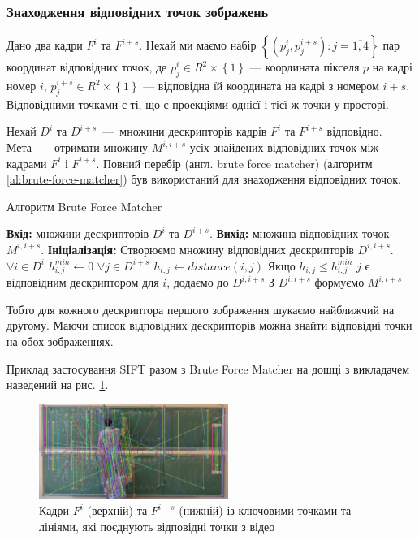 \subsubsection{Знаходження відповідних точок зображень}

Дано два кадри \(F^{i}\) та \(F^{i + s}\). Нехай ми маємо набір
\(\left\{ \left( p_{j}^{i},p_{j}^{i + s} \right):j = \overline{1,4} \right\}\)
пар координат відповідних точок, де
\(p_{j}^{i} \in R^{2} \times \left\{ 1 \right\}\) --- координата пікселя
\(p\) на кадрі номер \(i\),
\(p_{j}^{i + s} \in R^{2} \times \left\{ 1 \right\}\) --- відповідна їй
координата на кадрі з номером \(i + s\). Відповідними точками є ті, що є
проекціями однієї і тієї ж точки у просторі.

Нехай $D^i$ та $D^{i+s}$~---~множини дескрипторів кадрів \(F^{i}\) та \(F^{i + s}\)
відповідно. Мета~---~отримати множину \(M^{i,i+s}\) усіх знайдених відповідних точок  між кадрами
\(F^{i}\) і \(F^{i + s}\).
Повний перебір (англ. brute force matcher) (алгоритм \ref{al:brute-force-matcher})
був використаний для знаходження відповідних точок.

\begin{algorithm}[H]
    \caption{Алгоритм Brute Force Matcher}
    \label{al:brute-force-matcher}
    \begin{algorithmic}
        \State \textbf{Вхід:} множини дескрипторів $D^i$ та $D^{i+s}$.
        \State \textbf{Вихід:} множина відповідних точок \(M^{i,i+s}\).
        \State \textbf{Ініціалізація:} Створюємо множину відповідних дескрипторів $D^{i,i+s}$.
        \State $\forall i \in D^i$
        \State  \qquad $h^{min}_{i,j} \gets 0$
        \State  \qquad  $\forall j \in D^{i+s}$
        \State  \qquad \qquad  $h_{i,j} \gets distance(i,j)$
        \State  \qquad \qquad  Якщо {$h_{i,j} \leq h^{min}_{i,j}$}
        \State  \qquad \qquad  \qquad $j$ є відповідним  дескриптором для $i$, додаємо до  $D^{i,i+s}$
        \State З $D^{i,i+s}$ формуємо \(M^{i,i+s}\)
    \end{algorithmic}
\end{algorithm}

Тобто для кожного дескриптора першого зображення шукаємо найближчий на другому.
Маючи список відповідних дескрипторів можна знайти відповідні точки на обох зображеннях.

Приклад застосування SIFT разом з Brute Force Matcher на
дошці з викладачем наведений на рис. \ref{fig:matches_img}.

\begin{figure}[H]
    \centering
    \includegraphics[width=0.55\textwidth]{images/matches_img}
    \caption{Кадри $F^i$ (верхній) та $F^{i+s}$ (нижній) із ключовими точками та лініями,
        які поєднують відповідні точки з відео \cite{video:mmzi:yakovlev_discrete_math}
        \label{fig:matches_img}
    }
\end{figure}
